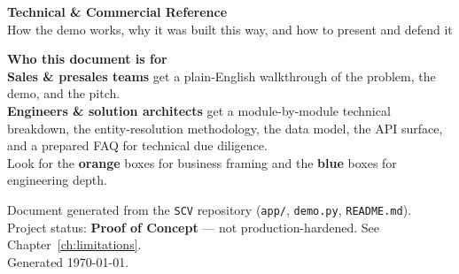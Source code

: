 \documentclass[11pt]{report}
\begin{document}
\begin{titlepage}
\vspace*{8.2cm}

\begin{center}
{\sffamily\bfseries\Large Technical \& Commercial Reference}\\[6pt]
{\sffamily\large\color{black!60} How the demo works, why it was built this way, and how to present and defend it}\\[24pt]
\end{center}

\vspace{1.5cm}
\begin{center}
\begin{tcolorbox}[width=0.85\textwidth, colback=bizboxbg, colframe=bizboxframe, arc=2mm, boxrule=0.6pt]
\centering
\textbf{Who this document is for}\\[4pt]
\footnotesize
\textbf{Sales \& presales teams} get a plain-English walkthrough of the problem, the demo, and the pitch.\\
\textbf{Engineers \& solution architects} get a module-by-module technical breakdown, the entity-resolution methodology, the data model, the API surface, and a prepared FAQ for technical due diligence.\\
Look for the \textcolor{bizboxframe}{\textbf{orange}} boxes for business framing and the \textcolor{engboxframe}{\textbf{blue}} boxes for engineering depth.
\end{tcolorbox}
\end{center}

\vfill
\begin{center}
\footnotesize\color{black!50}
Document generated from the \texttt{SCV} repository (\texttt{app/}, \texttt{demo.py}, \texttt{README.md}).\\
Project status: \textbf{Proof of Concept} --- not production-hardened. See Chapter~\ref{ch:limitations}.\\
Generated \today.
\end{center}
\end{titlepage}
\end{document}
